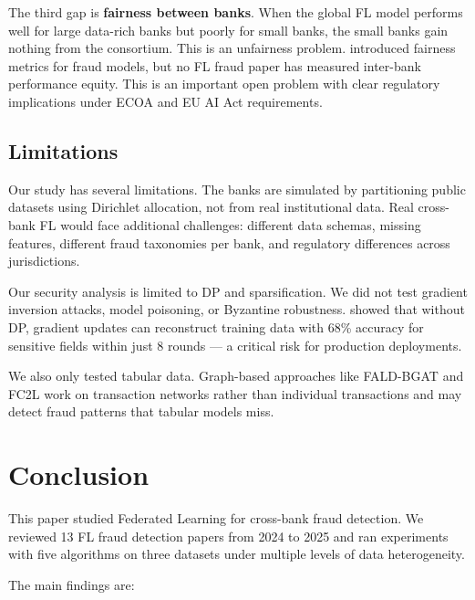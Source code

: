 \documentclass[12pt, a4paper]{article}
\begin{document}
The third gap is \textbf{fairness between banks}. When the global FL model performs well for large data-rich banks but poorly for small banks, the small banks gain nothing from the consortium. This is an unfairness problem. \citet{kamalaruban2024fairness} introduced fairness metrics for fraud models, but no FL fraud paper has measured inter-bank performance equity. This is an important open problem with clear regulatory implications under ECOA and EU AI Act requirements.

\subsection{Limitations}

Our study has several limitations. The banks are simulated by partitioning public datasets using Dirichlet allocation, not from real institutional data. Real cross-bank FL would face additional challenges: different data schemas, missing features, different fraud taxonomies per bank, and regulatory differences across jurisdictions.

Our security analysis is limited to DP and sparsification. We did not test gradient inversion attacks, model poisoning, or Byzantine robustness. \citet{zhu2019deep} showed that without DP, gradient updates can reconstruct training data with 68\% accuracy for sensitive fields within just 8 rounds --- a critical risk for production deployments.

We also only tested tabular data. Graph-based approaches like FALD-BGAT \citep{liu2024fald} and FC2L \citep{sun2025fc2l} work on transaction networks rather than individual transactions and may detect fraud patterns that tabular models miss.

\section{Conclusion}
\label{sec:conclusion}

This paper studied Federated Learning for cross-bank fraud detection. We reviewed 13 FL fraud detection papers from 2024 to 2025 and ran experiments with five algorithms on three datasets under multiple levels of data heterogeneity.

The main findings are:
\end{document}
